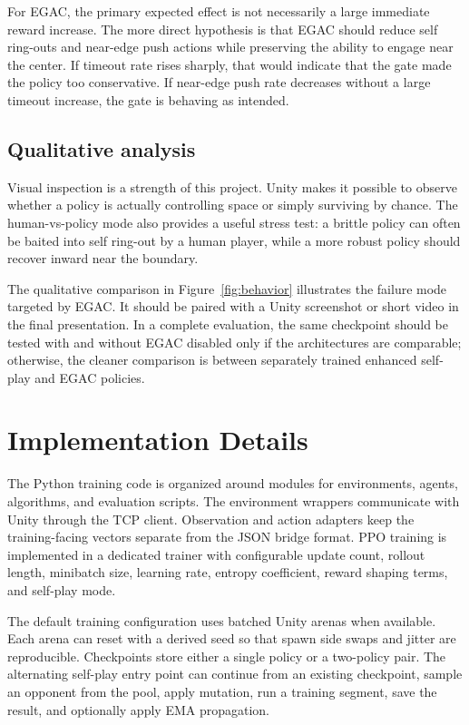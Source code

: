 \documentclass{article}
\begin{document}
For EGAC, the primary expected effect is not necessarily a large immediate reward increase. The more direct hypothesis is that EGAC should reduce self ring-outs and near-edge push actions while preserving the ability to engage near the center. If timeout rate rises sharply, that would indicate that the gate made the policy too conservative. If near-edge push rate decreases without a large timeout increase, the gate is behaving as intended.

\subsection{Qualitative analysis}

Visual inspection is a strength of this project. Unity makes it possible to observe whether a policy is actually controlling space or simply surviving by chance. The human-vs-policy mode also provides a useful stress test: a brittle policy can often be baited into self ring-out by a human player, while a more robust policy should recover inward near the boundary.

The qualitative comparison in Figure~\ref{fig:behavior} illustrates the failure mode targeted by EGAC. It should be paired with a Unity screenshot or short video in the final presentation. In a complete evaluation, the same checkpoint should be tested with and without EGAC disabled only if the architectures are comparable; otherwise, the cleaner comparison is between separately trained enhanced self-play and EGAC policies.

\section{Implementation Details}

The Python training code is organized around modules for environments, agents, algorithms, and evaluation scripts. The environment wrappers communicate with Unity through the TCP client. Observation and action adapters keep the training-facing vectors separate from the JSON bridge format. PPO training is implemented in a dedicated trainer with configurable update count, rollout length, minibatch size, learning rate, entropy coefficient, reward shaping terms, and self-play mode.

The default training configuration uses batched Unity arenas when available. Each arena can reset with a derived seed so that spawn side swaps and jitter are reproducible. Checkpoints store either a single policy or a two-policy pair. The alternating self-play entry point can continue from an existing checkpoint, sample an opponent from the pool, apply mutation, run a training segment, save the result, and optionally apply EMA propagation.
\end{document}
